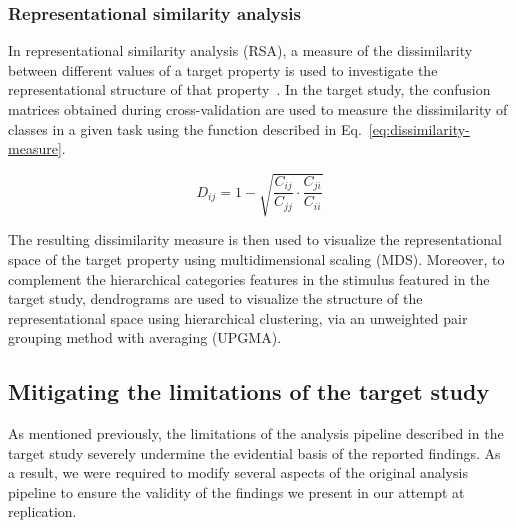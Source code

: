 \subsubsection{Representational similarity analysis}
In representational similarity analysis (RSA), a measure of the dissimilarity between different values of a target property is used to investigate the representational structure of that property~\citep{Kriegeskorte:2008}. In the target study, the confusion matrices obtained during cross-validation are used to measure the dissimilarity of classes in a given task using the function described in Eq.~\ref{eq:dissimilarity-measure}.

\begin{equation}
    D_{ij} = 1 - \sqrt{\frac{C_{ij}}{C_{jj}}\cdot \frac{C_{ji}}{C_{ii}}} \label{eq:dissimilarity-measure}
\end{equation}

The resulting dissimilarity measure is then used to visualize the representational space of the target property using multidimensional scaling (MDS). Moreover, to complement the hierarchical categories features in the stimulus featured in the target study, dendrograms are used to visualize the structure of the representational space using hierarchical clustering, via an unweighted pair grouping method with averaging (UPGMA). 

\subsection{Mitigating the limitations of the target study}

As mentioned previously, the limitations of the analysis pipeline described in the target study severely undermine the evidential basis of the reported findings. As a result, we were required to modify several aspects of the original analysis pipeline to ensure the validity of the findings we present in our attempt at replication. 

